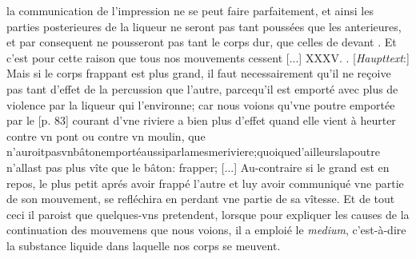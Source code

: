 \pend 
\pstart  
[p. 79] [...] la communication de l'impression ne se peut faire parfaitement, et ainsi les parties posterieures de la liqueur ne seront pas tant pouss\'{e}es que les anterieures, et par consequent ne pousseront pas tant le corps dur, que celles de devant . Et c'est pour cette raison que tous nos mouvements cessent [...]
\pend 
\count{}
 XXXV. . [\textit{Haupttext}:] Mais si le corps frappant est plus grand, il faut necessairement qu'il ne re\c{c}oive pas tant d'effet de la percussion que l'autre, parcequ'il est emport\'{e} avec plus de violence par la liqueur qui l'environne; car nous voions qu'vne poutre emport\'{e}e par le [p. 83] courant d'vne riviere a bien plus d'effet quand elle vient \`{a} heurter contre vn pont ou contre vn moulin, que n'auroit\hfill pas\hfill vn\hfill b\^{a}ton\hfill emport\'{e}\hfill aussi\hfill par\hfill la\hfill mesme\hfill riviere;\hfill quoique\hfill d'ailleurs\hfill la\hfill poutre
\pend
\newpage
\pstart \noindent n'allast pas plus v\^{i}te que le b\^{a}ton:  frapper; [...]
\pend 
\pstart  
[p. 84] Au-contraire si le grand est en repos, le plus petit apr\'{e}s avoir frapp\'{e} l'autre et luy avoir communiqu\'{e} vne partie de son mouvement, se refl\'{e}chira en perdant vne partie de sa v\^{i}tesse. Et de tout ceci il paroist  que quelques-vns pretendent, lorsque pour expliquer les causes de la continuation des mouvemens que nous voions, il a emploi\'{e} le \textit{medium}, c'est-\`{a}-dire la substance liquide dans laquelle nos corps se meuvent.
